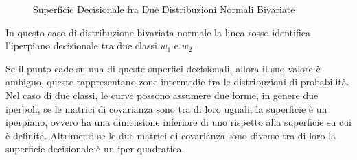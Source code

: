 \documentclass{article}
\numberwithin{equation}{subsection}
\begin{document}
\begin{figure}[H]%
    \centering
    \qquad
    \caption{Superficie Decisionale fra Due Distribuzioni Normali Bivariate}
\end{figure}
In questo caso di distribuzione bivariata normale la linea rosso identifica l'iperpiano decisionale tra due classi $w_1$ e $w_2$. 


Se il punto cade su una di queste superfici decisionali, allora il suo valore è ambiguo, queste rappresentano zone intermedie tra le distribuzioni di probabilità. 
Nel caso di due classi, le curve possono assumere due forme, in genere due iperboli, se le matrici di covarianza sono tra di loro uguali, la superficie è un iperpiano, ovvero ha una dimensione inferiore di uno rispetto alla superficie su cui è definita. Altrimenti se le due matrici di covarianza sono diverse tra di loro la superficie decisionale è un iper-quadratica. 
\end{document}
